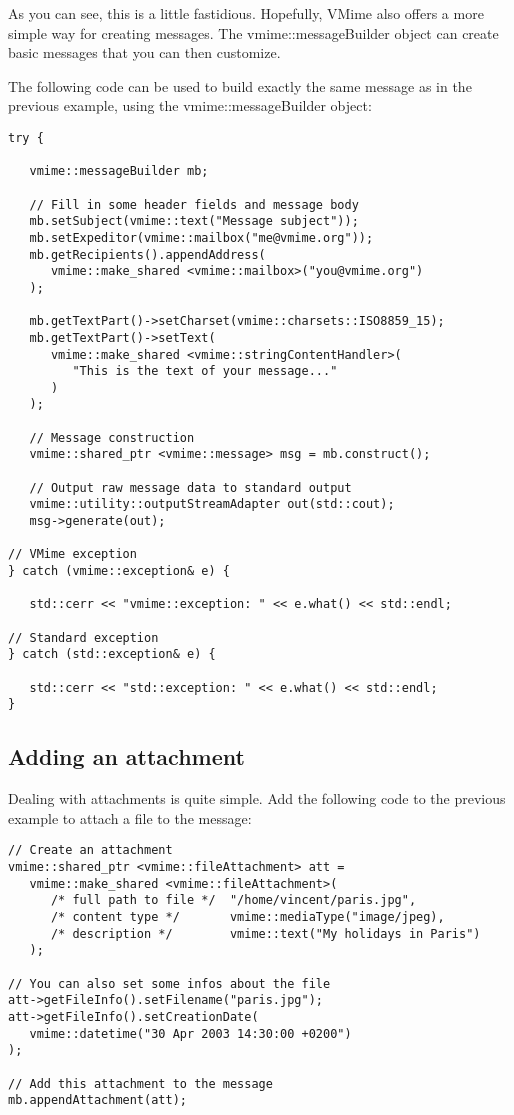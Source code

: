 As you can see, this is a little fastidious. Hopefully, VMime also offers a
more simple way for creating messages. The {\vcode vmime::messageBuilder}
object can create basic messages that you can then customize.

The following code can be used to build exactly the same message as in the
previous example, using the {\vcode vmime::messageBuilder} object:

\begin{lstlisting}[caption={Building a simple message
using {\vcode vmime::messageBuilder}}]
try {

   vmime::messageBuilder mb;

   // Fill in some header fields and message body
   mb.setSubject(vmime::text("Message subject"));
   mb.setExpeditor(vmime::mailbox("me@vmime.org"));
   mb.getRecipients().appendAddress(
      vmime::make_shared <vmime::mailbox>("you@vmime.org")
   );

   mb.getTextPart()->setCharset(vmime::charsets::ISO8859_15);
   mb.getTextPart()->setText(
      vmime::make_shared <vmime::stringContentHandler>(
         "This is the text of your message..."
      )
   );

   // Message construction
   vmime::shared_ptr <vmime::message> msg = mb.construct();

   // Output raw message data to standard output
   vmime::utility::outputStreamAdapter out(std::cout);
   msg->generate(out);

// VMime exception
} catch (vmime::exception& e) {

   std::cerr << "vmime::exception: " << e.what() << std::endl;

// Standard exception
} catch (std::exception& e) {

   std::cerr << "std::exception: " << e.what() << std::endl;
}
\end{lstlisting}


\subsection{Adding an attachment} %

Dealing with attachments is quite simple. Add the following code to the
previous example to attach a file to the message:

\begin{lstlisting}[caption={Building a message with an attachment using
{\vcode vmime::messageBuilder}}]
// Create an attachment
vmime::shared_ptr <vmime::fileAttachment> att =
   vmime::make_shared <vmime::fileAttachment>(
      /* full path to file */  "/home/vincent/paris.jpg",
      /* content type */       vmime::mediaType("image/jpeg),
      /* description */        vmime::text("My holidays in Paris")
   );

// You can also set some infos about the file
att->getFileInfo().setFilename("paris.jpg");
att->getFileInfo().setCreationDate(
   vmime::datetime("30 Apr 2003 14:30:00 +0200")
);

// Add this attachment to the message
mb.appendAttachment(att);
\end{lstlisting}


